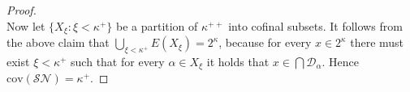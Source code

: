 \documentclass[12pt,a4paper]{scrartcl}
\theoremstyle{definition}
\numberwithin{equation}{section}
\begin{document}
\begin{proof}
\\
Now let $\{X_\xi \colon \xi < \kappa^+\}$ be a partition of $\kappa^{++}$ into cofinal subsets. It follows from the above claim that $\bigcup_{\xi < \kappa^+} E(X_\xi)= 2^\kappa$, because for every $x \in 2^\kappa$ there must exist $\xi < \kappa^+$ such that for every $\alpha \in X_\xi$ it holds that $x \in \bigcap \mathcal{D}_\alpha$. Hence $\text{cov}(\mathcal{SN})= \kappa^+$.
\end{proof}

\newpage
 

\end{document}
